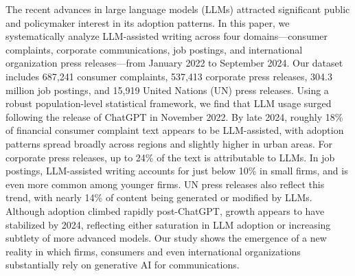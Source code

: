 The recent advances in large language models (LLMs) attracted significant public and policymaker interest in its adoption patterns.  In this paper, we systematically analyze LLM-assisted writing across four domains—consumer complaints, corporate communications, job postings, and international organization press releases—from January 2022 to September 2024. Our dataset includes 687,241 consumer complaints, 537,413 corporate press releases, 304.3 million job postings, and 15,919 United Nations (UN) press releases.
%
Using a robust population-level statistical framework, we find that LLM usage surged following the release of ChatGPT in November 2022. By late 2024, roughly 18\% of financial consumer complaint text appears to be LLM-assisted, with adoption patterns spread broadly across regions and slightly higher in urban areas. For corporate press releases, up to 24\% of the text is attributable to LLMs. In job postings, LLM-assisted writing accounts for just below 10\% in small firms, and is even more common among younger firms. UN press releases also reflect this trend, with nearly 14\% of content being generated or modified by LLMs.
% 
Although adoption climbed rapidly post-ChatGPT, growth appears to have stabilized by 2024, reflecting either saturation in LLM adoption or increasing subtlety of more advanced models. Our study shows the emergence of a new reality in which firms, consumers and even international organizations substantially rely on generative AI for communications. 


